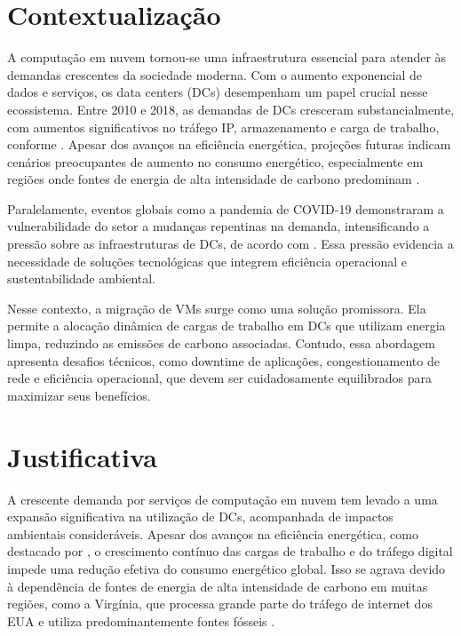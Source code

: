 \documentclass[
	12pt,				%
	oneside,			%
	a4paper,			%
	english,			%
	brazil				%
	]{abntex2ppgsi}
\begin{document}
\section{Contextualização}
A computação em nuvem tornou-se uma infraestrutura essencial para atender às demandas crescentes da sociedade moderna. Com o aumento exponencial de dados e serviços, os data centers (DCs) desempenham um papel crucial nesse ecossistema. Entre 2010 e 2018, as demandas de DCs cresceram substancialmente, com aumentos significativos no tráfego IP, armazenamento e carga de trabalho, conforme . Apesar dos avanços na eficiência energética, projeções futuras indicam cenários preocupantes de aumento no consumo energético, especialmente em regiões onde fontes de energia de alta intensidade de carbono predominam \cite{KOOT2021116798}.

Paralelamente, eventos globais como a pandemia de COVID-19 demonstraram a vulnerabilidade do setor a mudanças repentinas na demanda, intensificando a pressão sobre as infraestruturas de DCs, de acordo com . Essa pressão evidencia a necessidade de soluções tecnológicas que integrem eficiência operacional e sustentabilidade ambiental.

Nesse contexto, a migração de VMs surge como uma solução promissora. Ela permite a alocação dinâmica de cargas de trabalho em DCs que utilizam energia limpa, reduzindo as emissões de carbono associadas. Contudo, essa abordagem apresenta desafios técnicos, como downtime de aplicações, congestionamento de rede e eficiência operacional, que devem ser cuidadosamente equilibrados para maximizar seus benefícios.

\section{Justificativa}
A crescente demanda por serviços de computação em nuvem tem levado a uma expansão significativa na utilização de DCs, acompanhada de impactos ambientais consideráveis. Apesar dos avanços na eficiência energética, como destacado por , o crescimento contínuo das cargas de trabalho e do tráfego digital impede uma redução efetiva do consumo energético global. Isso se agrava devido à dependência de fontes de energia de alta intensidade de carbono em muitas regiões, como a Virgínia, que processa grande parte do tráfego de internet dos EUA e utiliza predominantemente fontes fósseis \cite{clicking_clean_virginia}.
\end{document}
